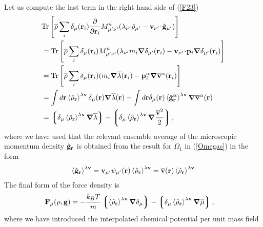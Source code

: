 \documentclass[b5paper,openright,10pt]{book}
\newcommand{\esc}{\!\cdot\!}
\newcommand{\llangle}{\left\langle}
\newcommand{\rrangle}{\right\rangle}
\newcommand{\llg}{\left\lgroup}
\newcommand{\rlg}{\right\rgroup}
\begin{document}
\begin{appendices}
\begin{align}
\label{F23}
\end{align}
Let us compute the last term in the right  hand side of (\ref{F23})
\begin{align}
  &{\rm Tr}\left[\overline{\rho}
\sum_i\delta_\mu({\bf r}_i)
\frac{\partial }{\partial {\bf r}_i}
M^\psi_{\mu'\nu'}(\lambda_{\nu'}\hat{\rho}_{\mu'}-{\bf v}_{\nu'}\esc\hat{\bf g}_{\mu'})\right] 
\nonumber \\
&={\rm Tr}\left[\overline{\rho}
\sum_i\delta_\mu({\bf r}_i)
M^\psi_{\mu'\nu'}(\lambda_{\nu'}m_i\boldsymbol{\nabla}\delta_{\mu'}({\bf r}_i)-{\bf v}_{\nu'}\esc{\bf p}_i
\boldsymbol{\nabla}\delta_{\mu'}({\bf r}_i)
\right]
\nonumber\\
&=
   {\rm Tr}\left[\overline{\rho}
\sum_i\delta_\mu({\bf r}_i)
(m_i\boldsymbol{\nabla}\overline{\lambda}({\bf r}_i)-{\bf p}_i^\alpha
\boldsymbol{\nabla}\overline{\bf v}^\alpha({\bf r}_i)
\right]
\nonumber\\
&= \int d{\bf r}\llangle \hat{\rho}_{\bf r}\rrangle^{\lambda{\bf v}}\delta_\mu({\bf r})
\boldsymbol{\nabla}\overline{\lambda}({\bf r})
- \int d{\bf r}\delta_\mu({\bf r})
\llangle \hat{\bf g}^\alpha_{\bf r}\rrangle^{\lambda{\bf v}}\boldsymbol{\nabla}\overline{\bf v}^\alpha({\bf r})
\nonumber\\
&=\llg\delta_\mu\llangle \hat{\rho}_{\bf r}\rrangle^{\lambda{\bf v}}\boldsymbol{\nabla}\overline{\lambda}\rlg
- \llg\delta_\mu\llangle\hat{\rho}_{\bf r}\rrangle^{\lambda{\bf v}}
\boldsymbol{\nabla}\frac{\overline{\bf v}^2}{2}  \rlg ,
\label{f1}
\end{align}
where  we  have  used  that  the  relevant  ensemble  average  of  the
microscopic momentum  density $\hat{\bf  g}_{\bf r}$ is  obtained from
the result for $\Omega_1$ in (\ref{Omegas}) in the form
\begin{align}
  \llangle \hat{\bf g}_{\bf r}\rrangle^{\lambda{\bf v}}={\bf v}_{\mu'}\psi_{\mu'}({\bf r})
\llangle\hat{\rho}_{\bf r}\rrangle^{\lambda{\bf v}}=\overline{\bf v}({\bf r})\llangle\hat{\rho}_{\bf r}\rrangle^{\lambda{\bf v}}
\end{align}
The final form of the force density is 
\begin{align}
  {\bf F}_\mu(\rho,{\bf g})
  &=-\frac{k_BT}{m}\llg\llangle\hat{\rho}_{\bf r}\rrangle^{\lambda{\bf v}}
\boldsymbol{\nabla}\delta_\mu\rlg
-\llg\delta_\mu\llangle\hat{\rho}_{\bf r}\rrangle^{\lambda{\bf v}}\boldsymbol{\nabla}\overline{\mu}\rlg,
\end{align} 
where we have introduced the interpolated chemical potential  per unit mass field
\begin{align}

\end{align}
\end{appendices}
\end{document}
